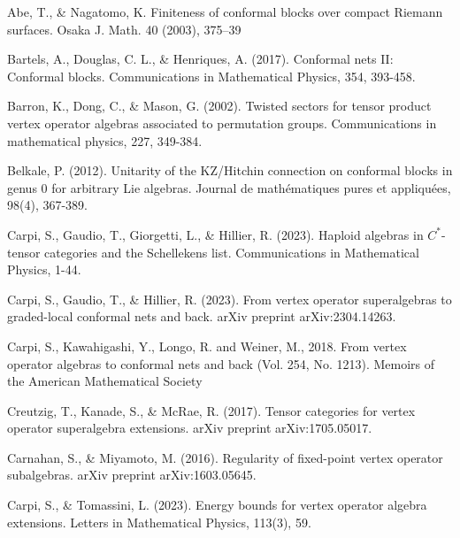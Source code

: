 \documentclass[11pt,b5paper,notitlepage]{article}
\theoremstyle{definition}
\theoremstyle{plain}
\numberwithin{equation}{section}
\begin{document}
\newpage

\printindex	






	\begin{thebibliography}{999999}
		\footnotesize	

Abe, T., \& Nagatomo, K.  Finiteness of conformal blocks over compact Riemann surfaces. Osaka J. Math. 40 (2003), 375–39

Bartels, A., Douglas, C. L., \& Henriques, A. (2017). Conformal nets II: Conformal blocks. Communications in Mathematical Physics, 354, 393-458.



Barron, K., Dong, C., \& Mason, G. (2002). Twisted sectors for tensor product vertex operator algebras associated to permutation groups. Communications in mathematical physics, 227, 349-384.


Belkale, P. (2012). Unitarity of the KZ/Hitchin connection on conformal blocks in genus 0 for arbitrary Lie algebras. Journal de mathématiques pures et appliquées, 98(4), 367-389.




Carpi, S., Gaudio, T., Giorgetti, L., \& Hillier, R. (2023). Haploid algebras in $ C^*$-tensor categories and the Schellekens list. Communications in Mathematical Physics, 1-44.

Carpi, S., Gaudio, T., \& Hillier, R. (2023). From vertex operator superalgebras to graded-local conformal nets and back. arXiv preprint arXiv:2304.14263.



Carpi, S., Kawahigashi, Y., Longo, R. and Weiner, M., 2018. From vertex operator algebras to conformal nets and back (Vol. 254, No. 1213). Memoirs of the American Mathematical Society


Creutzig, T., Kanade, S., \& McRae, R. (2017). Tensor categories for vertex operator superalgebra extensions. arXiv preprint arXiv:1705.05017.

Carnahan, S., \& Miyamoto, M. (2016). Regularity of fixed-point vertex operator subalgebras. arXiv preprint arXiv:1603.05645.

Carpi, S., \& Tomassini, L. (2023). Energy bounds for vertex operator algebra extensions. Letters in Mathematical Physics, 113(3), 59.



\end{thebibliography}
\end{document}
